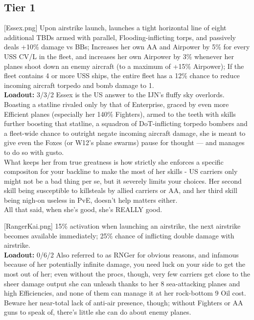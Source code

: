 \subsection{Tier 1}
[Essex.png]
{Upon airstrike launch, launches a tight horizontal line of eight additional TBDs armed with parallel, Flooding-inflicting torps, and passively deals +10\% damage vs BBs; Increases her own AA and Airpower by 5\% for every USS CV/L in the fleet, and increases her own Airpower by 3\% whenever her planes shoot down an enemy aircraft (to a maximum of +15\% Airpower); If the fleet contains 4 or more USS ships, the entire fleet has a 12\% chance to reduce incoming aircraft torpedo and bomb damage to 1.\\
\textbf{Loadout:} 3/3/2}
{}
{Essex is the US answer to the IJN's fluffy sky overlords.\\
Boasting a statline rivaled only by that of Enterprise, graced by even more Efficient planes (especially her 140\% Fighters), armed to the teeth with skills further boosting that statline, a squadron of DoT-inflicting torpedo bombers and a fleet-wide chance to outright negate incoming aircraft damage, she is meant to give even the Foxes (or W12's plane swarms) pause for thought --- and manages to do so with gusto.\\
What keeps her from true greatness is how strictly she enforces a specific compositon for your backline to make the most of her skills - US carriers only might not be a bad thing per se, but it severely limits your choices. Her second skill being susceptible to killsteals by allied carriers or AA, and her third skill being nigh-on useless in PvE, doesn't help matters either.\\
All that said, when she's good, she's REALLY good.}

[RangerKai.png]
{15\% activation when launching an airstrike, the next airstrike becomes available immediately; 25\% chance of inflicting double damage with airstrike.\\
\textbf{Loadout:} 0/6/2}
{}
{Also referred to as RNGer for obvious reasons, and infamous because of her potentially infinite damage, you need luck on your side to get the most out of her; even without the procs, though, very few carriers get close to the sheer damage output she can unleash thanks to her 8 sea-attacking planes and high Efficiencies, and none of them can manage it at her rock-bottom 9 Oil cost.\\
Beware her near-total lack of anti-air presence, though; without Fighters or AA guns to speak of, there's little she can do about enemy planes.}

